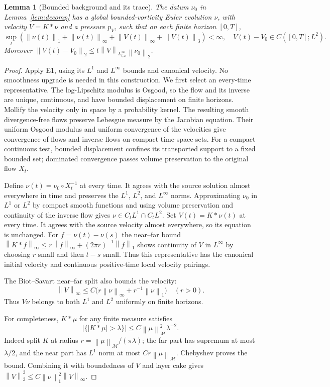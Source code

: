 \documentclass[11pt]{article}
\newtheorem{lemma}[theorem]{Lemma}
\theoremstyle{remark}\newtheorem{remark}[theorem]{Remark}
\newcommand{\M}{\mathcal M}
\newcommand{\norm}[2]{\left\|#1\right\|_{#2}}
\begin{document}
\begin{lemma}[Bounded background and its trace]\label{lem:background}
The datum $\nu_0$ in Lemma~\ref{lem:decomp} has a global bounded-vorticity Euler evolution
$\nu$, with velocity $V=K*\nu$ and a pressure $p_V$, such that on each finite
horizon $[0,T]$,
\[
 \sup_t(\norm{\nu(t)}1+\norm{\nu(t)}\infty+
 \norm{V(t)}\infty+\norm{V(t)}3)<\infty,
 \quad V(t)-V_0\in C([0,T];L^2).
\]
Moreover $\norm{V(t)-V_0}2\leq
t\norm V{L^\infty_{t,x}}\norm{\nu_0}2$.
\end{lemma}
\begin{proof}
Apply E1, using its $L^1$ and $L^\infty$ bounds and canonical velocity.
No smoothness upgrade is needed in this construction.
We first select an every-time representative.
The log-Lipschitz modulus is Osgood, so the flow and
its inverse are unique, continuous, and have bounded displacement on finite
horizons. Mollify the velocity only in space by a probability kernel.
The resulting smooth divergence-free flows preserve Lebesgue measure by
the Jacobian equation. Their uniform Osgood modulus and uniform convergence
of the velocities give convergence of flows and inverse flows on compact
time-space sets. For a compact continuous test, bounded displacement confines
its transported support to a fixed bounded set; dominated convergence passes
volume preservation to the original flow $X_t$.

Define $\nu(t)=\nu_0\circ X_t^{-1}$ at every time. It agrees with the source
solution almost everywhere in time and preserves the $L^1$, $L^2$, and
$L^\infty$ norms. Approximating $\nu_0$ in $L^1$ or $L^2$ by compact smooth
functions and using volume preservation and continuity of the inverse flow
gives $\nu\in C_tL^1\cap C_tL^2$. Set $V(t)=K*\nu(t)$ at every time.
It agrees with the source velocity almost everywhere, so its equation is
unchanged. For $f=\nu(t)-\nu(s)$ the near--far bound
$\norm{K*f}\infty\leq r\norm f\infty+(2\pi r)^{-1}\norm f1$
shows continuity of $V$ in $L^\infty$ by choosing $r$ small and then $t-s$
small. Thus this representative has the canonical initial velocity and
continuous positive-time local velocity pairings.

The Biot--Savart near--far split also bounds the velocity:
\[
 \norm V\infty\leq C\bigl(r\norm\nu\infty+r^{-1}\norm\nu1\bigr)
 \quad(r>0).
\]
Thus $V\nu$ belongs to both $L^1$ and $L^2$ uniformly on finite horizons.

For completeness, $K*\mu$ for any finite measure satisfies
\[
 |\{|K*\mu|>\lambda\}|\leq C\norm\mu\M^2\lambda^{-2}.
\]
Indeed split $K$ at radius $r=\norm\mu\M/(\pi\lambda)$; the far part has
supremum at most $\lambda/2$, and the near part has $L^1$ norm at most
$Cr\norm\mu\M$. Chebyshev proves the bound. Combining it with boundedness
of $V$ and layer cake gives $\norm V3^3\leq C\norm\nu1^2\norm V\infty$.


\end{proof}
\end{document}
